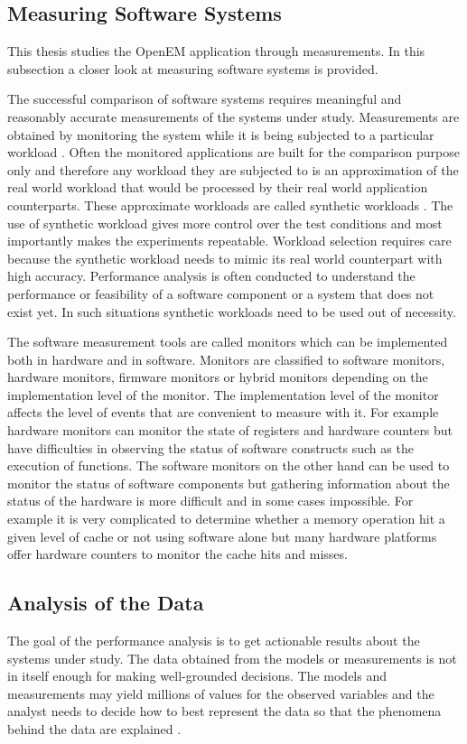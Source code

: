 \subsection{Measuring Software Systems}
\label{subsec:measure}
This thesis studies the OpenEM application through measurements. In this
subsection a closer look at measuring software systems is provided.

The successful comparison of software systems requires meaningful and reasonably
accurate measurements of the systems under study. Measurements are obtained by
monitoring the system while it is being subjected to a particular workload
\cite{jain1991art}. Often the monitored applications are built for the
comparison purpose only and therefore any workload they are subjected to is an
approximation of the real world workload that would be processed by their real
world application counterparts. These approximate workloads are called synthetic
workloads \cite{jain1991art}. The use of synthetic workload gives more control
over the test conditions and most importantly makes the experiments repeatable.
Workload selection requires care because the synthetic workload needs to mimic
its real world counterpart with high accuracy. Performance analysis is often
conducted to understand the performance or feasibility of a software component
or a system that does not exist yet. In such situations synthetic workloads need
to be used out of necessity. 

The software measurement tools are called monitors which can be implemented both
in hardware and in software. Monitors are classified to software monitors,
hardware monitors, firmware monitors or hybrid monitors depending on the
implementation level of the monitor. The implementation level of the monitor
affects the level of events that are convenient to measure with it. For example
hardware monitors can monitor the state of registers and hardware counters but
have difficulties in observing the status of software constructs such as the
execution of functions. The software monitors on the other hand can be used to
monitor the status of software components but gathering information about the
status of the hardware is more difficult and in some cases impossible.
\cite{jain1991art} For example it is very complicated to determine whether a
memory operation hit a given level of cache or not using software alone but many
hardware platforms offer hardware counters to monitor the cache hits and misses.

\subsection{Analysis of the Data}
The goal of the performance analysis is to get actionable results about the
systems under study. The data obtained from the models or measurements is not in
itself enough for making well-grounded decisions. The models and measurements
may yield millions of values for the observed variables and the analyst needs to
decide how to best represent the data so that the phenomena behind the data are
explained \cite{jain1991art}.

